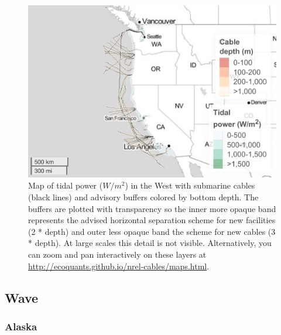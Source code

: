 \documentclass[]{article}
\begin{document}
\begin{figure}
\centering
\includegraphics{report_files/figure-latex/mapTideWest-1.pdf}
\caption{\label{fig:mapTideWest}Map of tidal power (\(W/m^2\)) in the West
with submarine cables (black lines) and advisory buffers colored by
bottom depth. The buffers are plotted with transparency so the inner
more opaque band represents the advised horizontal separation scheme for
new facilities (2 * depth) and outer less opaque band the scheme for new
cables (3 * depth). At large scales this detail is not visible.
Alternatively, you can zoom and pan interactively on these layers at
\url{http://ecoquants.github.io/nrel-cables/maps.html}.}
\end{figure}

\hypertarget{wave-1}{%
\subsection{Wave}\label{wave-1}}

\hypertarget{alaska-1}{%
\subsubsection{Alaska}\label{alaska-1}}
\end{document}
